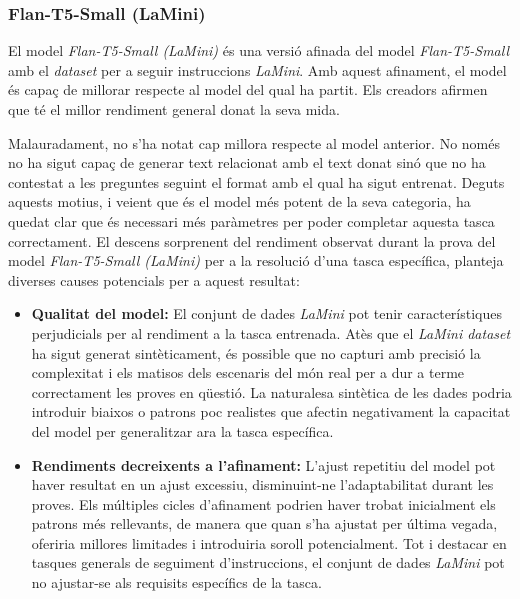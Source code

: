 \subsubsection{Flan-T5-Small (LaMini)}
El model \textit{Flan-T5-Small (LaMini)} \cite{flan-t5} \cite{lamini} és una versió afinada del model \textit{Flan-T5-Small} amb el \textit{dataset} per a seguir instruccions \textit{LaMini}. Amb aquest afinament, el model és capaç de millorar respecte al model del qual ha partit. Els creadors afirmen que té el millor rendiment general donat la seva mida.

Malauradament, no s'ha notat cap millora respecte al model anterior. No només no ha sigut capaç de generar text relacionat amb el text donat sinó que no ha contestat a les preguntes seguint el format amb el qual ha sigut entrenat. Deguts aquests motius, i veient que és el model més potent de la seva categoria, ha quedat clar que és necessari més paràmetres per poder completar aquesta tasca correctament. El descens sorprenent del rendiment observat durant la prova del model \textit{Flan-T5-Small (LaMini)} per a la resolució d'una tasca específica, planteja diverses causes potencials per a aquest resultat:

\begin{itemize}
  \item \textbf{Qualitat del model:} El conjunt de dades \textit{LaMini} pot tenir característiques perjudicials per al rendiment a la tasca entrenada. Atès que el \textit{LaMini dataset} ha sigut generat sintèticament, és possible que no capturi amb precisió la complexitat i els matisos dels escenaris del món real per a dur a terme correctament les proves en qüestió. La naturalesa sintètica de les dades podria introduir biaixos o patrons poc realistes que afectin negativament la capacitat del model per generalitzar ara la tasca específica.
  \item \textbf{Rendiments decreixents a l'afinament:} L'ajust repetitiu del model pot haver resultat en un ajust excessiu, disminuint-ne l'adaptabilitat durant les proves. Els múltiples cicles d'afinament podrien haver trobat inicialment els patrons més rellevants, de manera que quan s'ha ajustat per última vegada, oferiria millores limitades i introduiria soroll potencialment. Tot i destacar en tasques generals de seguiment d'instruccions, el conjunt de dades \textit{LaMini} pot no ajustar-se als requisits específics de la tasca.
\end{itemize}



